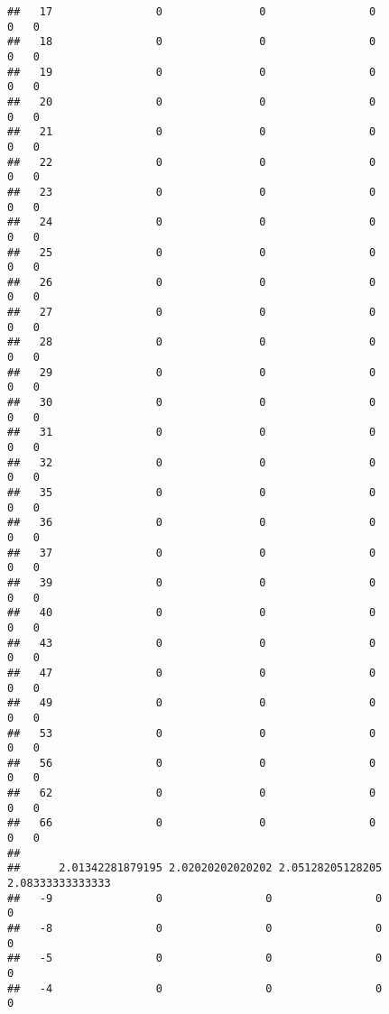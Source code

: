 \documentclass[]{article}
\begin{document}
\begin{verbatim}
##   17                0               0                0                0   0
##   18                0               0                0                0   0
##   19                0               0                0                0   0
##   20                0               0                0                0   0
##   21                0               0                0                0   0
##   22                0               0                0                0   0
##   23                0               0                0                0   0
##   24                0               0                0                0   0
##   25                0               0                0                0   0
##   26                0               0                0                0   0
##   27                0               0                0                0   0
##   28                0               0                0                0   0
##   29                0               0                0                0   0
##   30                0               0                0                0   0
##   31                0               0                0                0   0
##   32                0               0                0                0   0
##   35                0               0                0                0   0
##   36                0               0                0                0   0
##   37                0               0                0                0   0
##   39                0               0                0                0   0
##   40                0               0                0                0   0
##   43                0               0                0                0   0
##   47                0               0                0                0   0
##   49                0               0                0                0   0
##   53                0               0                0                0   0
##   56                0               0                0                0   0
##   62                0               0                0                0   0
##   66                0               0                0                0   0
##     
##      2.01342281879195 2.02020202020202 2.05128205128205 2.08333333333333
##   -9                0                0                0                0
##   -8                0                0                0                0
##   -5                0                0                0                0
##   -4                0                0                0                0

\end{verbatim}
\end{document}
